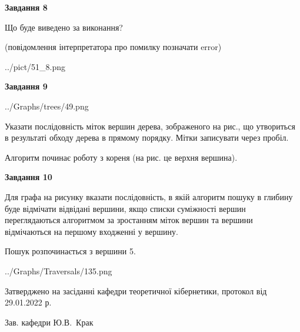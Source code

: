 \documentclass[12pt, ukrainian]{article}
\begin{document}
{\begin {large}
{\begin {center}\textbf{Завдання 8}\end {center}}\par
Що буде виведено за виконання?\par
 (повідомлення інтерпретатора про помилку позначати error)\par
\begin{center}
	{../pict/51_8.png}
\end{center}
\newpage

{\begin {center}\textbf{Завдання 9}\end {center}}\par

\begin{center}
	{../Graphs/trees/49.png}
\end{center}
Указати послідовність міток вершин дерева, зображеного на рис., що утвориться в результаті обходу дерева в прямому порядку. Мітки записувати через пробіл.\par Алгоритм починає роботу з кореня (на рис. це верхня вершина).\par
\newpage

{\begin {center}\textbf{Завдання 10}\end {center}}\par
Для графа на рисунку вказати послідовність, в якій алгоритм пошуку в глибину буде відмічати відвідані вершини, якщо списки суміжності вершин переглядаються алгоритмом за зростанням міток вершин та вершини відмічаються на першому вход\-женні у вершину.\par
Пошук розпочинається з вершини 5.\par

\begin{center}
	{../Graphs/Traversals/135.png}
\end{center}\par
\newpage


\end {large}
}
{\smallskip \begin {small} Затверджено на засіданні кафедри теоретичної кібернетики, протокол  від   29.01.2022 р.\par\smallskip\smallskip
{\parbox {6.5 cm}{Зав. кафедри \dotfill Ю.В.~Крак}} \end{small}}
\end{document}
